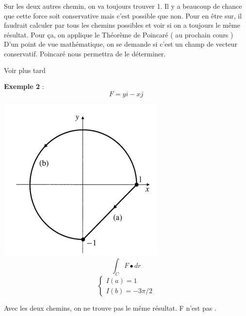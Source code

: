 Sur les deux autres chemin, on va toujours trouver 1. Il y a beaucoup de chance que cette force soit conservative mais c'est possible que non. Pour en être sur, il faudrait calculer par tous les chemins possibles et voir si on a toujours le même résultat. Pour ça, on applique le Théorème de Poincaré ( au prochain cours ) D'un point de vue mathématique, on se demande si c'est un champ de vecteur conservatif. Poincaré nous permettra de le déterminer.

\begin{mytheo}[Poincaré]
Voir plus tard
\end{mytheo}
\textbf{Exemple 2 }: \[F=yi-xj\]

\includegraphics[scale=0.7]{resolu2.png}
\[\int_C F \bullet dr\]
$$\left\{
\begin{array}{l}
I(a)=1\\
I(b)=-3\pi/2
\end{array}
\right.
$$

Avec les deux chemins, on ne trouve pas le même résultat. F n'est pas .
